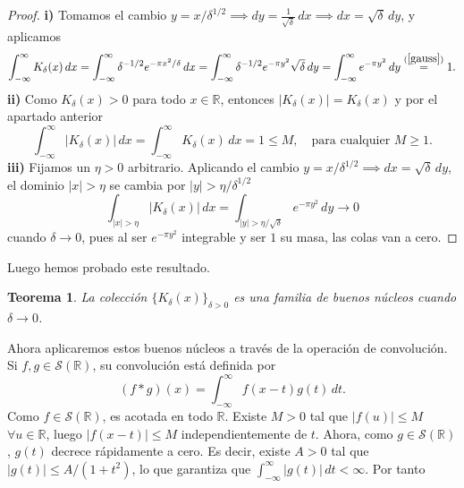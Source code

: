 \documentclass[12pt]{article}
\newcommand{\R}{\mathbb{R}}
\newcommand{\Sc}{\mathcal{S}(\mathbb{R})}
\theoremstyle{plain}
\newtheorem{teorema}{Teorema}[section] %
\theoremstyle{definition}
\numberwithin{equation}{section}
\begin{document}
            \begin{proof}
                \textbf{i)} Tomamos el cambio \(y = x/\delta^{1/2} \implies dy = \frac{1}{\sqrt{\delta}} \,dx \implies dx = \sqrt{\delta} \,dy\), y aplicamos
                \begin{equation*}
                    \int_{-\infty}^{\infty} K_\delta(x) \,dx = \int_{-\infty}^{\infty} \delta^{-1/2} e^{-\pi x^2/\delta} \,dx = \int_{-\infty}^{\infty} \delta^{-1/2} e^{-\pi y^2} \sqrt{\delta} \,dy = \int_{-\infty}^{\infty} e^{-\pi y^2} \,dy \stackrel{(\ref{gauss})}{=} 1.
                \end{equation*}
                \textbf{ii)} Como \(K_\delta(x) > 0\) para todo \(x \in \R\), entonces \(\left\lvert K_\delta(x) \right\rvert = K_\delta(x)\) y por el apartado anterior
                \begin{equation*}
                    \int_{-\infty}^{\infty} \left\lvert K_\delta(x) \right\rvert \,dx = \int_{-\infty}^{\infty} K_\delta(x) \,dx = 1 \leq M, \quad \text{para cualquier } M \geq 1.
                \end{equation*}
                \textbf{iii)} Fijamos un \(\eta > 0\) arbitrario. Aplicando el cambio \(y = x / \delta^{1/2} \implies dx = \sqrt{\delta} \,dy\), el dominio \(\left\lvert x \right\rvert > \eta\) se cambia por \(\left\lvert y \right\rvert > \eta / \delta^{1/2}\)
                \begin{equation*}
                    \int_{\left\lvert x \right\rvert > \eta} \left\lvert K_\delta(x) \right\rvert \,dx = \int_{\left\lvert y \right\rvert > \eta / \sqrt{\delta}} e^{-\pi y^2} \,dy \longrightarrow 0
                \end{equation*}
                cuando \(\delta \to 0\), pues al ser \(e^{-\pi y^2}\) integrable y ser \(1\) su masa, las colas van a cero.
            \end{proof}
            Luego hemos probado este resultado.
            \begin{teorema}
                La colección \(\{K_\delta(x)\}_{\delta > 0}\) es una familia de buenos núcleos cuando \(\delta \to 0\).
            \end{teorema}
            Ahora aplicaremos estos buenos núcleos a través de la operación de convolución. Si \(f, g \in \Sc\), su convolución está definida por
            \begin{equation*}
                (f * g)(x) = \int_{-\infty}^{\infty} f(x-t)g(t) \,dt.
            \end{equation*}
            Como \(f \in \Sc\), es acotada en todo \(\R\). Existe \(M > 0\) tal que \(\left\lvert f(u) \right\rvert \le M\) \(\forall u \in \R\), luego \(\left\lvert f(x-t) \right\rvert \le M\) independientemente de \(t\). Ahora, como \(g \in \Sc\), \(g(t)\) decrece rápidamente a cero. Es decir, existe \(A > 0\) tal que \(\left\lvert g(t) \right\rvert \le A/(1+t^2)\), lo que garantiza que \(\int_{-\infty}^{\infty} \left\lvert g(t) \right\rvert \,dt < \infty\). Por tanto
\end{document}
